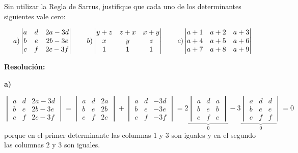 \documentclass[a4paper,12pt]{article}
\begin{document}
\begin{ejercicio}[title=Ejercicio 33]
Sin utilizar la Regla de Sarrus, justifique que cada uno de los determinantes siguientes vale cero:

\[
\begin{tabular}{clclcl}
$a)\begin{vmatrix}
a & d & 2a - 3d\\
b & e & 2b - 3e\\
c & f & 2c - 3f
\end{vmatrix}\quad$ &
$b)\begin{vmatrix}
y + z & z + x & x + y\\
x & y & z\\
1 & 1 & 1
\end{vmatrix}\quad$ &
$c)\begin{vmatrix}
a + 1 & a + 2 & a + 3\\
a + 4 & a + 5 & a + 6\\
a + 7 & a + 8 & a + 9
\end{vmatrix}$
\end{tabular}
\]

\tcblower
\textbf{Resolución:}

\textbf{a)}

\[
\begin{vmatrix}
a & d & 2a-3d\\
b & e & 2b-3e\\
c & f & 2c-3f
\end{vmatrix}
=
\begin{vmatrix}
a & d & 2a\\
b & e & 2b\\
c & f & 2c
\end{vmatrix}
+
\begin{vmatrix}
a & d & -3d\\
b & e & -3e\\
c & f & -3f
\end{vmatrix}
=2
\underbrace{
\begin{vmatrix}
a & d & a\\
b & e & b\\
c & f & c
\end{vmatrix}}_{0}
-3
\underbrace{
\begin{vmatrix}
a & d & d\\
b & e & e\\
c & f & f
\end{vmatrix}}_{0}
= \boxed{0}
\]
porque en el primer determinante las columnas \(1\) y \(3\) son iguales y en el segundo las columnas \(2\) y \(3\) son iguales.


\end{ejercicio}
\end{document}
